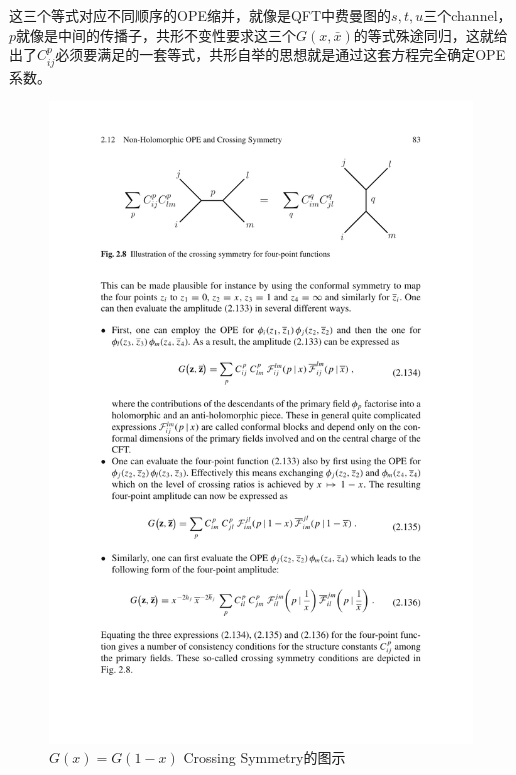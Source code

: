 这三个等式对应不同顺序的OPE缩并，就像是QFT中费曼图的$s,t,u$三个channel，$p$就像是中间的传播子，共形不变性要求这三个$G(x,\bar x)$的等式殊途同归，这就给出了$C^p_{ij}$必须要满足的一套等式，共形自举的思想就是通过这套方程完全确定OPE系数。
\begin{figure}[htbp]
	\centering
	\includegraphics{figs/fig10.pdf}
	\caption{$G(x)=G(1-x)$ Crossing Symmetry的图示}
\end{figure}
